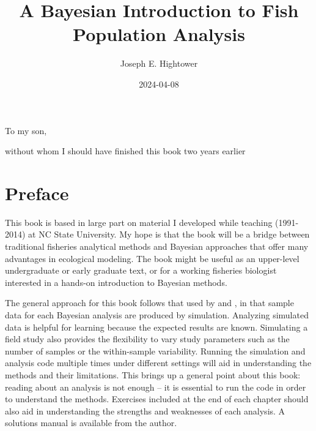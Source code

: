 \documentclass[
]{krantz}
\title{A Bayesian Introduction to Fish Population Analysis}
\author{Joseph E. Hightower}
\date{2024-04-08}
\begin{document}
\maketitle


\thispagestyle{empty}

\begin{center}
To my son,

without whom I should have finished this book two years earlier
\end{center}

\setlength{\abovedisplayskip}{-5pt}
\setlength{\abovedisplayshortskip}{-5pt}

{
\hypersetup{linkcolor=}
\setcounter{tocdepth}{2}
\tableofcontents
}
\listoffigures
\listoftables
\hypertarget{preface}{%
\chapter*{Preface}\label{preface}}


This book is based in large part on material I developed while teaching (1991-2014) at NC State University. My hope is that the book will be a bridge between traditional fisheries analytical methods and Bayesian approaches that offer many advantages in ecological modeling. The book might be useful as an upper-level undergraduate or early graduate text, or for a working fisheries biologist interested in a hands-on introduction to Bayesian methods.

The general approach for this book follows that used by \citet{kery_2010} and \citet{kery.schaub_2011}, in that sample data for each Bayesian analysis are produced by simulation. Analyzing simulated data is helpful for learning because the expected results are known. Simulating a field study also provides the flexibility to vary study parameters such as the number of samples or the within-sample variability. Running the simulation and analysis code multiple times under different settings will aid in understanding the methods and their limitations. This brings up a general point about this book: reading about an analysis is not enough -- it is essential to run the code in order to understand the methods. Exercises included at the end of each chapter should also aid in understanding the strengths and weaknesses of each analysis. A solutions manual is available from the author.
\end{document}
